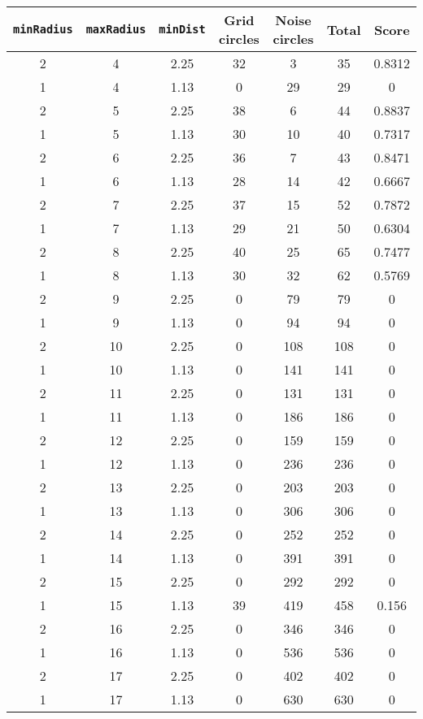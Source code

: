 \documentclass[letterpaper, 12pt]{article}
\begin{document}
\begin{longtable}{|c|c|c|c|c|c|c|}
\hline
\textbf{\texttt{minRadius}} & \textbf{\texttt{maxRadius}} & \textbf{\texttt{minDist}} & \textbf{Grid circles} & \textbf{Noise circles} & \textbf{Total} & \textbf{Score} \\
\hline
2 & 4 & 2.25 & 32 & 3 & 35 & 0.8312 \\
\hline
1 & 4 & 1.13 & 0 & 29 & 29 & 0 \\
\hline
2 & 5 & 2.25 & 38 & 6 & 44 & 0.8837 \\
\hline
1 & 5 & 1.13 & 30 & 10 & 40 & 0.7317 \\
\hline
2 & 6 & 2.25 & 36 & 7 & 43 & 0.8471 \\
\hline
1 & 6 & 1.13 & 28 & 14 & 42 & 0.6667 \\
\hline
2 & 7 & 2.25 & 37 & 15 & 52 & 0.7872 \\
\hline
1 & 7 & 1.13 & 29 & 21 & 50 & 0.6304 \\
\hline
2 & 8 & 2.25 & 40 & 25 & 65 & 0.7477 \\
\hline
1 & 8 & 1.13 & 30 & 32 & 62 & 0.5769 \\
\hline
2 & 9 & 2.25 & 0 & 79 & 79 & 0 \\
\hline
1 & 9 & 1.13 & 0 & 94 & 94 & 0 \\
\hline
2 & 10 & 2.25 & 0 & 108 & 108 & 0 \\
\hline
1 & 10 & 1.13 & 0 & 141 & 141 & 0 \\
\hline
2 & 11 & 2.25 & 0 & 131 & 131 & 0 \\
\hline
1 & 11 & 1.13 & 0 & 186 & 186 & 0 \\
\hline
2 & 12 & 2.25 & 0 & 159 & 159 & 0 \\
\hline
1 & 12 & 1.13 & 0 & 236 & 236 & 0 \\
\hline
2 & 13 & 2.25 & 0 & 203 & 203 & 0 \\
\hline
1 & 13 & 1.13 & 0 & 306 & 306 & 0 \\
\hline
2 & 14 & 2.25 & 0 & 252 & 252 & 0 \\
\hline
1 & 14 & 1.13 & 0 & 391 & 391 & 0 \\
\hline
2 & 15 & 2.25 & 0 & 292 & 292 & 0 \\
\hline
1 & 15 & 1.13 & 39 & 419 & 458 & 0.156 \\
\hline
2 & 16 & 2.25 & 0 & 346 & 346 & 0 \\
\hline
1 & 16 & 1.13 & 0 & 536 & 536 & 0 \\
\hline
2 & 17 & 2.25 & 0 & 402 & 402 & 0 \\
\hline
1 & 17 & 1.13 & 0 & 630 & 630 & 0 \\

\end{longtable}
\end{document}
